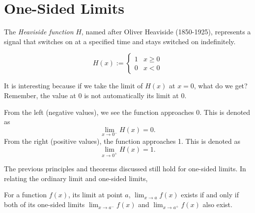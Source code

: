 \section{One-Sided Limits}
The \textit{Heaviside function} $H$, named after Oliver Heaviside (1850-1925), represents a signal that switches on at a specified time and stays switched on indefinitely.

\begin{equation}
	H(x) := \begin{cases}
		1 & x \geq 0 \\
		0 & x < 0
	\end{cases}
\end{equation}

\begin{marginfigure}
	\centering
	\resizebox{\linewidth}{!}{%
	}
	\caption{The \textit{Heaviside function} $H(x)$, where it breaks at $x=0$.}
	\label{fig:heaviside-func}
\end{marginfigure}

It is interesting because if we take the limit of $H(x)$ at $x=0$, what do we get? Remember, the value at 0 is not automatically its limit at 0.

From the left (negative values), we see the function approaches 0. This is denoted as
\[\lim_{x\to 0^-} H(x) = 0.\]
From the right (positive values), the function approaches 1. This is denoted as
\[\lim_{x\to 0^+} H(x) = 1.\]

The previous principles and theorems discussed still hold for one-sided limits. In relating the ordinary limit and one-sided limits,

\begin{thm}
	For a function $f(x)$, its limit at point $a$, $\lim_{x\to a} f(x)$ exists if and only if both of its one-sided limits $\lim_{x\to a^-} f(x)$ and $\lim_{x\to a^+} f(x)$ also exist.
\end{thm}




